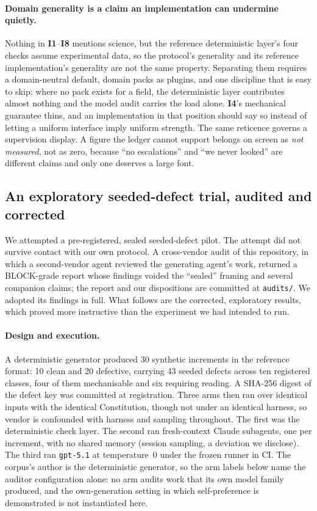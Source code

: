 \documentclass[11pt,letterpaper]{article}
\newcommand{\invariant}[1]{\textbf{I#1}}
\begin{document}
\paragraph{Domain generality is a claim an implementation can undermine quietly.} Nothing in \invariant{1}--\invariant{8} mentions science, but the reference deterministic layer's four checks assume experimental data, so the protocol's generality and its reference implementation's generality are not the same property. Separating them requires a domain-neutral default, domain packs as plugins, and one discipline that is easy to skip: where no pack exists for a field, the deterministic layer contributes almost nothing and the model audit carries the load alone. \invariant{4}'s mechanical guarantee thins, and an implementation in that position should say so instead of letting a uniform interface imply uniform strength. The same reticence governs a supervision display. A figure the ledger cannot support belongs on screen as \emph{not measured}, not as zero, because ``no escalations'' and ``we never looked'' are different claims and only one deserves a large font.

\subsection{An exploratory seeded-defect trial, audited and corrected}\label{sec:pilot}

We attempted a pre-registered, sealed seeded-defect pilot. The attempt did not survive contact with our own protocol. A cross-vendor audit of this repository, in which a second-vendor agent reviewed the generating agent's work, returned a BLOCK-grade report whose findings voided the ``sealed'' framing and several companion claims; the report and our dispositions are committed at \texttt{audits/}. We adopted its findings in full. What follows are the corrected, exploratory results, which proved more instructive than the experiment we had intended to run.

\paragraph{Design and execution.} A deterministic generator produced 30 synthetic increments in the reference format: 10 clean and 20 defective, carrying 43 seeded defects across ten registered classes, four of them mechanisable and six requiring reading. A SHA-256 digest of the defect key was committed at registration. Three arms then ran over identical inputs with the identical Constitution, though not under an identical harness, so vendor is confounded with harness and sampling throughout. The first was the deterministic check layer. The second ran fresh-context Claude subagents, one per increment, with no shared memory (session sampling, a deviation we disclose). The third ran \texttt{gpt-5.1} at temperature~0 under the frozen runner in CI. The corpus's author is the deterministic generator, so the arm labels below name the auditor configuration alone: no arm audits work that its own model family produced, and the own-generation setting in which self-preference is demonstrated \cite{panickssery2024} is not instantiated here.
\end{document}
